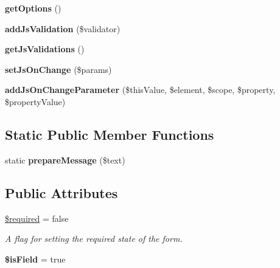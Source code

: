 \begin{DoxyCompactItemize}
\item 
\hypertarget{class_field_af91a78102df0d89cf30f1fd50c41ccbf}{
{\bfseries getOptions} ()}
\label{class_field_af91a78102df0d89cf30f1fd50c41ccbf}

\item 
\hypertarget{class_field_abb5d7d077c65dc89a738dbffa401db84}{
{\bfseries addJsValidation} (\$validator)}
\label{class_field_abb5d7d077c65dc89a738dbffa401db84}

\item 
\hypertarget{class_field_a3744edc8f9e251640d3210091554bd5f}{
{\bfseries getJsValidations} ()}
\label{class_field_a3744edc8f9e251640d3210091554bd5f}

\item 
\hypertarget{class_field_a25d9355ea4043fab56181098a8421eaa}{
{\bfseries setJsOnChange} (\$params)}
\label{class_field_a25d9355ea4043fab56181098a8421eaa}

\item 
\hypertarget{class_field_a16fa0c3d9bfeca5a142f9f5a5953a858}{
{\bfseries addJsOnChangeParameter} (\$thisValue, \$element, \$scope, \$property, \$propertyValue)}
\label{class_field_a16fa0c3d9bfeca5a142f9f5a5953a858}

\end{DoxyCompactItemize}
\subsection*{Static Public Member Functions}
\begin{DoxyCompactItemize}
\item 
\hypertarget{class_field_afcab950b7e13543cf687254c4d0cddf8}{
static {\bfseries prepareMessage} (\$text)}
\label{class_field_afcab950b7e13543cf687254c4d0cddf8}

\end{DoxyCompactItemize}
\subsection*{Public Attributes}
\begin{DoxyCompactItemize}
\item 
\hyperlink{class_field_a35200aef0bac45d2d4fe1932f48c05d6}{\$required} = false
\begin{DoxyCompactList}\small\item\em A flag for setting the required state of the form. \item\end{DoxyCompactList}\item 
\hypertarget{class_field_a5d1f259852e892ddd5910a20a66aefc4}{
{\bfseries \$isField} = true}
\label{class_field_a5d1f259852e892ddd5910a20a66aefc4}

\end{DoxyCompactItemize}
